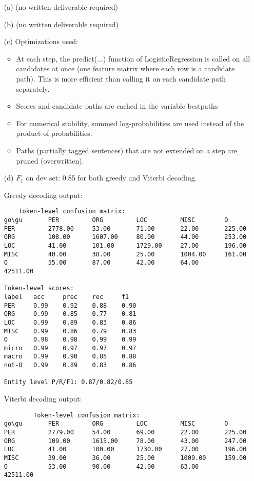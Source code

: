 \documentclass{article}
\begin{document}
\begin{itemize}
    \item[(a)] (no written deliverable required)
    \item[(b)] (no written deliverable required)
    \item[(c)] Optimizations used:
    \begin{itemize}

    \item At each step, the predict(...) function of LogisticRegression is called on all candidates at once (one feature matrix where each row is a candidate path). This is more efficient than calling it on each candidate path separately.
    \item Scores and candidate paths are cached in the variable best\textunderscore paths
    \item For numerical stability, summed log-probabilities are used instead of the product of probabilities.
    \item Paths (partially tagged sentences) that are not extended on a step are pruned (overwritten).
    \end{itemize}

    \item[(d)] $F_1$ on dev set: 0.85 for both greedy and Viterbi decoding.
    
Greedy decoding output:

\begin{verbatim}
    Token-level confusion matrix:
go\gu   	PER     	ORG     	LOC     	MISC    	O       
PER     	2778.00 	53.00   	71.00   	22.00   	225.00  
ORG     	108.00  	1607.00 	80.00   	44.00   	253.00  
LOC     	41.00   	101.00  	1729.00 	27.00   	196.00  
MISC    	40.00   	38.00   	25.00   	1004.00 	161.00  
O       	55.00   	87.00   	42.00   	64.00   	42511.00

Token-level scores:
label	acc  	prec 	rec  	f1   
PER  	0.99 	0.92 	0.88 	0.90 
ORG  	0.99 	0.85 	0.77 	0.81 
LOC  	0.99 	0.89 	0.83 	0.86 
MISC 	0.99 	0.86 	0.79 	0.83 
O    	0.98 	0.98 	0.99 	0.99 
micro	0.99 	0.97 	0.97 	0.97 
macro	0.99 	0.90 	0.85 	0.88 
not-O	0.99 	0.89 	0.83 	0.86 

Entity level P/R/F1: 0.87/0.82/0.85

\end{verbatim}

    Viterbi decoding output:

    \begin{verbatim}
        Token-level confusion matrix:
go\gu   	PER     	ORG     	LOC     	MISC    	O       
PER     	2779.00 	54.00   	69.00   	22.00   	225.00  
ORG     	109.00  	1615.00 	78.00   	43.00   	247.00  
LOC     	41.00   	100.00  	1730.00 	27.00   	196.00  
MISC    	39.00   	36.00   	25.00   	1009.00 	159.00  
O       	53.00   	90.00   	42.00   	63.00   	42511.00


\end{verbatim}
\end{itemize}
\end{document}
